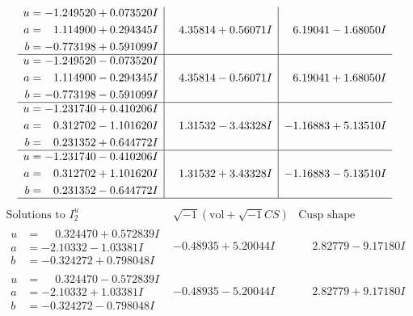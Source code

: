 \documentclass[1p]{elsarticle_modified}
\theoremstyle{definition}
\newcommand{\I}{\sqrt{-1}}
\begin{document}
$$\begin{array}{c|c|c}
\begin{aligned}
u &= -1.249520 + 0.073520 I \\
a &= \phantom{-}1.114900 + 0.294345 I \\
b &= -0.773198 + 0.591099 I\end{aligned}
 & \phantom{-}4.35814 + 0.56071 I & \phantom{-}6.19041 - 1.68050 I \\ \hline\begin{aligned}
u &= -1.249520 - 0.073520 I \\
a &= \phantom{-}1.114900 - 0.294345 I \\
b &= -0.773198 - 0.591099 I\end{aligned}
 & \phantom{-}4.35814 - 0.56071 I & \phantom{-}6.19041 + 1.68050 I \\ \hline\begin{aligned}
u &= -1.231740 + 0.410206 I \\
a &= \phantom{-}0.312702 - 1.101620 I \\
b &= \phantom{-}0.231352 + 0.644772 I\end{aligned}
 & \phantom{-}1.31532 - 3.43328 I & -1.16883 + 5.13510 I \\ \hline\begin{aligned}
u &= -1.231740 - 0.410206 I \\
a &= \phantom{-}0.312702 + 1.101620 I \\
b &= \phantom{-}0.231352 - 0.644772 I\end{aligned}
 & \phantom{-}1.31532 + 3.43328 I & -1.16883 - 5.13510 I\\
 \hline 
 \end{array}$$\newpage$$\begin{array}{c|c|c}  
\text{Solutions to }I^u_{2}& \I (\text{vol} + \sqrt{-1}CS) & \text{Cusp shape}\\
 \hline 
\begin{aligned}
u &= \phantom{-}0.324470 + 0.572839 I \\
a &= -2.10332 - 1.03381 I \\
b &= -0.324272 + 0.798048 I\end{aligned}
 & -0.48935 + 5.20044 I & \phantom{-}2.82779 - 9.17180 I \\ \hline\begin{aligned}
u &= \phantom{-}0.324470 - 0.572839 I \\
a &= -2.10332 + 1.03381 I \\
b &= -0.324272 - 0.798048 I\end{aligned}
 & -0.48935 - 5.20044 I & \phantom{-}2.82779 + 9.17180 I \\ \hline\begin{aligned}

\end{aligned}
\end{array}$$
\end{document}
